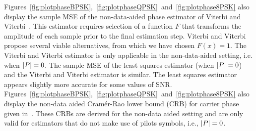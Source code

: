 \documentclass[journal]{IEEEtran}
\begin{document}
Figures~\ref{fig:plotphaseBPSK},~\ref{fig:plotphaseQPSK}~and~\ref{fig:plotphase8PSK} also display the sample MSE of the non-data-aided phase estimator of Viterbi and Viterbi~\cite{ViterbiViterbi_phase_est_1983}.  This estimator requires selection of a function $F$ that transforms the amplitude of each sample prior to the final estimation step.  %
Viterbi and Viterbi propose several viable alternatives, from which we have chosen $F(x) = 1$.  The Viterbi and Viterbi estimator is only applicable in the non-data-aided setting, i.e. when ${\left\vert P \right\vert} = 0$.  The sample MSE of the least squares estimator (when ${\left\vert P \right\vert} = 0$) and the Viterbi and Viterbi estimator is similar.  The least squares estimator appears slightly more accurate for some values of SNR.
Figures~\ref{fig:plotphaseBPSK},~\ref{fig:plotphaseQPSK}~and~\ref{fig:plotphase8PSK} also display the non-data aided Cram\'{e}r-Rao lower bound (CRB) for carrier phase given in~\cite{Cowley_crbs_phase_freq_1996}.  These CRBs are derived for the non-data aided setting and are only valid for estimators that do not make use of pilots symbols, i.e., ${\left\vert P \right\vert}=0$.

\end{document}
